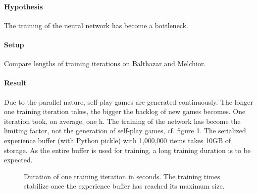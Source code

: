 \paragraph{Hypothesis} The training of the neural network has become a bottleneck.
\paragraph{Setup} Compare lengths of training iterations on Balthazar and Melchior.

\paragraph{Result} Due to the parallel nature, self-play games are generated continuously. The longer one training iteration takes, the bigger the backlog of new games becomes. One iteration took, on average, one h. The training of the network has become the limiting factor, not the generation of self-play games, cf. figure \ref{iteration_duration}. The serialized experience buffer (with Python pickle) with 1,000,000 items takes 10GB of storage. As the entire buffer is used for training, a long training duration is to be expected.

\begin{figure}[!h]
    \centering
    \hfill
    \caption{Duration of one training iteration in seconds. The training times stabilize once the experience buffer has reached its maximum size.}
    \label{iteration_duration}
\end{figure}